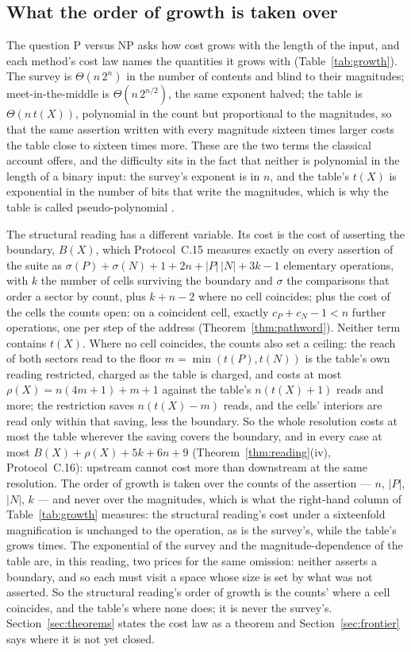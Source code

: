 \documentclass[pdflatex,sn-mathphys-num]{sn-jnl}
\theoremstyle{thmstyleone}%
\theoremstyle{thmstyletwo}%
\theoremstyle{thmstylethree}%
\begin{document}
\subsection{What the order of growth is taken over}\label{sec:growth}
The question P versus NP asks how cost grows with the length of the input, and each method's cost law names the quantities it grows with (Table~\ref{tab:growth}). The survey is $\Theta(n\,2^n)$ in the number of contents and blind to their magnitudes; meet-in-the-middle is $\Theta(n\,2^{n/2})$, the same exponent halved; the table is $\Theta(n\,t(X))$, polynomial in the count but proportional to the magnitudes, so that the same assertion written with every magnitude sixteen times larger costs the table close to sixteen times more. These are the two terms the classical account offers, and the difficulty sits in the fact that neither is polynomial in the length of a binary input: the survey's exponent is in $n$, and the table's $t(X)$ is exponential in the number of bits that write the magnitudes, which is why the table is called pseudo-polynomial \citep{GareyJohnson1979}.

The structural reading has a different variable. Its cost is the cost of asserting the boundary, $B(X)$, which Protocol~C.15 measures exactly on every assertion of the suite as $\sigma(P)+\sigma(N)+1+2n+|P|\,|N|+3k-1$ elementary operations, with $k$ the number of cells surviving the boundary and $\sigma$ the comparisons that order a sector by count, plus $k+n-2$ where no cell coincides; plus the cost of the cells the counts open: on a coincident cell, exactly $c_P+c_N-1<n$ further operations, one per step of the address (Theorem~\ref{thm:pathword}). Neither term contains $t(X)$. Where no cell coincides, the counts also set a ceiling: the reach of both sectors read to the floor $m=\min(t(P),t(N))$ is the table's own reading restricted, charged as the table is charged, and costs at most $\rho(X)=n(4m+1)+m+1$ against the table's $n(t(X)+1)$ reads and more; the restriction saves $n(t(X)-m)$ reads, and the cells' interiors are read only within that saving, less the boundary. So the whole resolution costs at most the table wherever the saving covers the boundary, and in every case at most $B(X)+\rho(X)+5k+6n+9$ (Theorem~\ref{thm:reading}(iv), Protocol~C.16): upstream cannot cost more than downstream at the same resolution. The order of growth is taken over the counts of the assertion --- $n$, $|P|$, $|N|$, $k$ --- and never over the magnitudes, which is what the right-hand column of Table~\ref{tab:growth} measures: the structural reading's cost under a sixteenfold magnification is unchanged to the operation, as is the survey's, while the table's grows \growthMTable{} times. The exponential of the survey and the magnitude-dependence of the table are, in this reading, two prices for the same omission: neither asserts a boundary, and so each must visit a space whose size is set by what was not asserted. So the structural reading's order of growth is the counts' where a cell coincides, and the table's where none does; it is never the survey's. Section~\ref{sec:theorems} states the cost law as a theorem and Section~\ref{sec:frontier} says where it is not yet closed.
\end{document}
